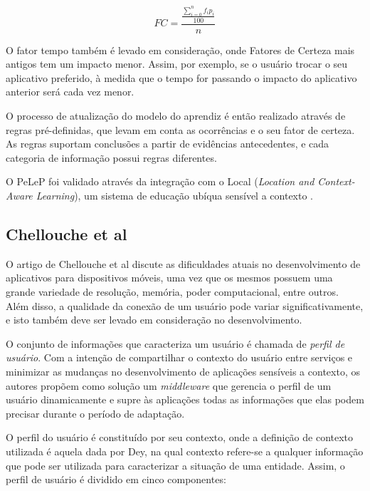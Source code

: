 \begin{equation}
  FC = \frac{\frac{\displaystyle\sum_{i=0}^n f_i p_i}{100}}{n}
  \label{eq:pelep-fc}
\end{equation}

O fator tempo também é levado em consideração, onde Fatores de Certeza mais antigos tem um impacto menor. Assim, por exemplo, se o usuário trocar o seu aplicativo preferido, à medida que o tempo for passando o impacto do aplicativo anterior será cada vez menor.

O processo de atualização do modelo do aprendiz é então realizado através de regras pré-definidas, que levam em conta as ocorrências e o seu fator de certeza. As regras suportam conclusões a partir de evidências antecedentes, e cada categoria de informação possui regras diferentes.

O PeLeP foi validado através da integração com o Local ({\em Location and Context-Aware Learning}), um sistema de educação ubíqua sensível a contexto \cite{barbosa08}.


\subsection{Chellouche et al}

O artigo de Chellouche et al\cite{chellouche10} discute as dificuldades atuais no desenvolvimento de aplicativos para dispositivos móveis, uma vez que os mesmos possuem uma grande variedade de resolução, memória, poder computacional, entre outros. Além disso, a qualidade da conexão de um usuário pode variar significativamente, e isto também deve ser levado em consideração no desenvolvimento.

O conjunto de informações que caracteriza um usuário é chamada de \emph{perfil de usuário}. Com a intenção de compartilhar o contexto do usuário entre serviços e minimizar as mudanças no desenvolvimento de aplicações sensíveis a contexto, os autores propõem como solução um \emph{middleware} que gerencia o perfil de um usuário dinamicamente e supre às aplicações todas as informações que elas podem precisar durante o período de adaptação.

O perfil do usuário é constituído por seu contexto, onde a definição de contexto utilizada é aquela dada por Dey\cite{dey2001}, na qual contexto refere-se a qualquer informação que pode ser utilizada para caracterizar a situação de uma entidade. Assim, o perfil de usuário é dividido em cinco componentes:

